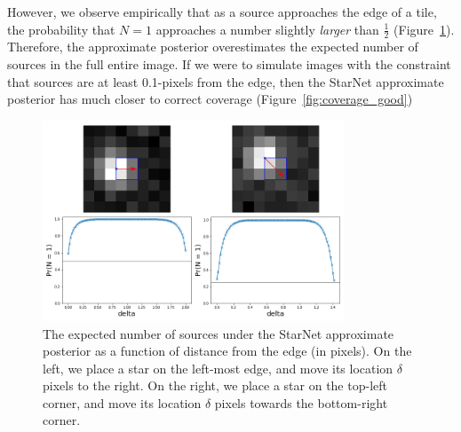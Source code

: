 However, we observe empirically that as a source approaches the edge of a tile,
the probability that $N = 1$ approaches a number
slightly \textit{larger} than $\frac{1}{2}$ (Figure~\ref{fig:starnet_edges}).
Therefore, the approximate posterior overestimates the expected number of sources in the full entire image.
If we were to simulate images with the constraint that sources are at least 0.1-pixels from the edge,
then the StarNet approximate posterior has much closer to correct coverage (Figure~\ref{fig:coverage_good})

\begin{figure}[tb]
    \centering
    \includegraphics[width=0.8\textwidth]{./figures/coverage/edges_example.png}
    \vspace{-0.4cm}
    \caption{The expected number of sources under the StarNet approximate posterior as a function of distance from the edge (in pixels).
    On the left, we place a star on the left-most edge, and move its location $\delta$ pixels to the right.
    On the right, we place a star on the top-left corner, and move its location $\delta$ pixels towards the bottom-right corner.}
    \label{fig:starnet_edges}
\end{figure}

